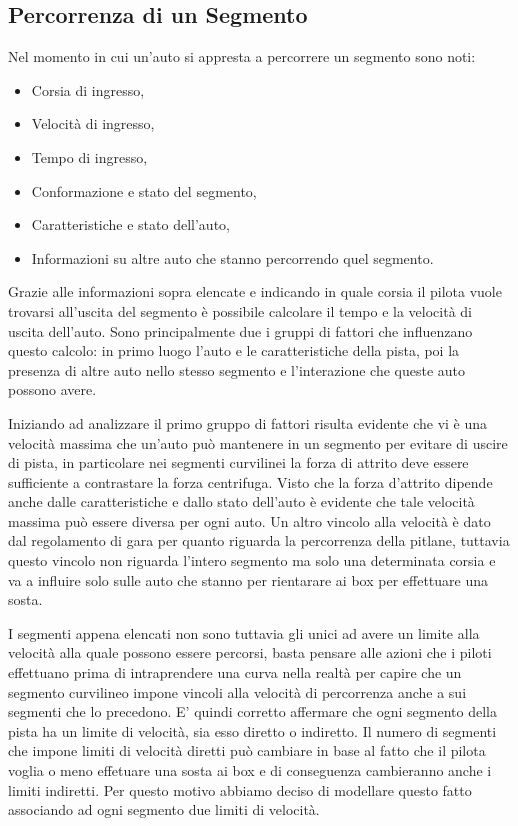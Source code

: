 \documentclass[11pt,a4paper]{report}
\begin{document}
\subsection{Percorrenza di un Segmento}
\label{txt:percorrenza}
Nel momento in cui un'auto si appresta a percorrere un segmento sono noti:
\begin{itemize}
\item Corsia di ingresso,
\item Velocità di ingresso,
\item Tempo di ingresso,
\item Conformazione e stato del segmento,
\item Caratteristiche e stato dell'auto,
\item Informazioni su altre auto che stanno percorrendo quel segmento.
\end{itemize}
Grazie alle informazioni sopra elencate e indicando in quale corsia il pilota vuole trovarsi all'uscita del segmento è possibile calcolare il tempo e la velocità di uscita dell'auto. Sono principalmente due i gruppi di fattori che influenzano questo calcolo: in primo luogo l'auto e le caratteristiche della pista, poi la presenza di altre auto nello stesso segmento e l'interazione che queste auto possono avere.

Iniziando ad analizzare il primo gruppo di fattori risulta evidente che vi è una velocità massima che un'auto può mantenere in un segmento per evitare di uscire di pista, in particolare nei segmenti curvilinei la forza di attrito deve essere sufficiente a contrastare la forza centrifuga.
Visto che la forza d'attrito dipende anche dalle caratteristiche e dallo stato dell'auto è evidente che tale velocità massima può essere diversa per ogni auto.
Un altro vincolo alla velocità è dato dal regolamento di gara per quanto riguarda la percorrenza della pitlane, tuttavia questo vincolo non riguarda l'intero segmento ma solo una determinata corsia e va a influire solo sulle auto che stanno per rientarare ai box per effettuare una sosta.

I segmenti appena elencati non sono tuttavia gli unici ad avere un limite alla velocità alla quale possono essere percorsi, basta pensare alle azioni che i piloti effettuano prima di intraprendere una curva nella realtà per capire che un segmento curvilineo impone vincoli alla velocità di percorrenza anche a sui segmenti che lo precedono. E' quindi corretto affermare che ogni segmento della pista ha un limite di velocità, sia esso diretto o indiretto. Il numero di segmenti che impone limiti di velocità diretti può cambiare in base al fatto che il pilota voglia o meno effetuare una sosta ai box e di conseguenza cambieranno anche i limiti indiretti. Per questo motivo abbiamo deciso di modellare questo fatto associando ad ogni segmento due limiti di velocità.
\end{document}
